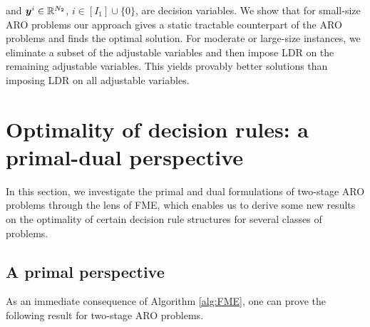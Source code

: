\documentclass[fleqn,isre,blindrev]{informs4}
\newcommand{\mb}[1]{\mbox{\boldmath \ensuremath{#1}}}
\renewcommand{\Re}{\mathbb{R}}
\begin{document}
and $\mb{y}^i \in \Re^{N_2}$, $i\in [I_1]\cup \{0\}$, are decision variables. We show that for small-size ARO problems our approach gives a static tractable counterpart of the ARO problems and finds the optimal solution. For moderate or large-size instances, we eliminate a subset of the adjustable variables and then impose LDR on the remaining adjustable variables. This yields provably better solutions than imposing LDR on all adjustable variables.
	

		
	\section{Optimality of decision rules: a primal-dual perspective} \label{sec:ODR}
	In this section, we investigate the primal and dual formulations of two-stage ARO problems through the lens of FME, which enables us to derive some new results on the optimality of certain decision rule structures for several classes of problems.
	
\subsection{A primal perspective}
As an immediate consequence of Algorithm \ref{alg:FME}, one can prove the following result for two-stage ARO problems. 
\end{document}

